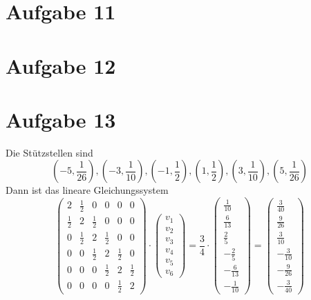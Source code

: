\documentclass[10pt,a4paper]{article}
\begin{document}
\section{Aufgabe 11}

\section{Aufgabe 12}

\section{Aufgabe 13}

Die Stützstellen sind
\begin{equation}
  (-5, \frac{1}{26}), (-3, \frac{1}{10}), (-1, \frac{1}{2}), (1, \frac{1}{2}), (3, \frac{1}{10}), (5, \frac{1}{26})
\end{equation}
Dann ist das lineare Gleichungssystem
\begin{equation}
  \begin{pmatrix}
    2 & \frac{1}{2} & 0 & 0 & 0 & 0\\
    \frac{1}{2} & 2 & \frac{1}{2} & 0 & 0 & 0\\
    0 & \frac{1}{2} & 2 & \frac{1}{2} & 0 & 0\\
    0 & 0 & \frac{1}{2} & 2 & \frac{1}{2} & 0\\
    0 & 0 & 0 & \frac{1}{2} & 2 & \frac{1}{2}\\
    0 & 0 & 0 & 0 & \frac{1}{2} & 2
  \end{pmatrix}
  \cdot
  \begin{pmatrix}
    v_{1}\\
    v_{2}\\
    v_{3}\\
    v_{4}\\
    v_{5}\\
    v_{6}
  \end{pmatrix}
  =
  \frac{3}{4} \cdot
  \begin{pmatrix}
    \frac{1}{10}\\
    \frac{6}{13}\\
    \frac{2}{5}\\
    -\frac{2}{5}\\
    -\frac{6}{13}\\
    -\frac{1}{10}
  \end{pmatrix}
  =
  \begin{pmatrix}
    \frac{3}{40}\\
    \frac{9}{26}\\
    \frac{3}{10}\\
    -\frac{3}{10}\\
    -\frac{9}{26}\\
    -\frac{3}{40}
  \end{pmatrix}
\end{equation}
\end{document}
